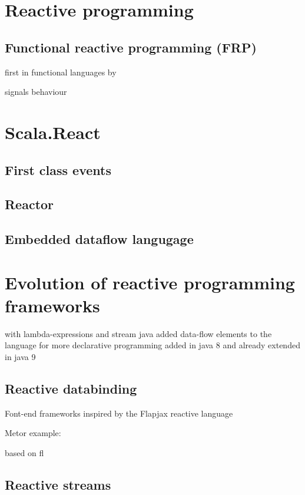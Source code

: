 \documentclass[format=acmtog]{acmart}
\begin{document}
\section{Reactive programming}

	\subsection{Functional reactive programming (FRP)}

		first in functional languages by~\cite{Elliott}

		signals behaviour~\cite{Bainomugisha:2013}
	

\section{Scala.React}

	\subsection{First class events}

	\subsection{Reactor}

	\subsection{Embedded dataflow langugage}

\section{Evolution of reactive programming frameworks}

	with lambda-expressions and stream java added data-flow elements to the language for more declarative programming
	added in java 8 and already extended in java 9

	\subsection{Reactive databinding}

		Font-end frameworks inspired by the Flapjax reactive language~\cite{Meyerovich:2009}

		Metor example: ~\cite{hochhaus2016meteor}

		based on fl

	\subsection{Reactive streams}



\end{document}
